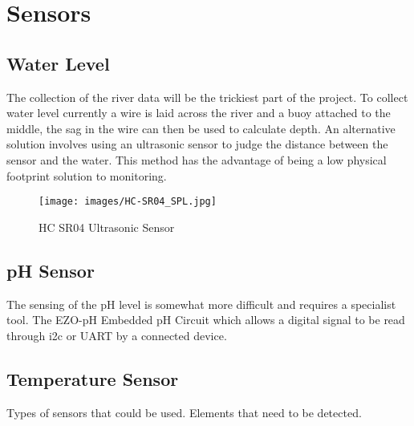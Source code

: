 \section{Sensors}
\subsection{Water Level}
The collection of the river data will be the trickiest part of the project. To collect water level currently a wire is laid across the river and a buoy attached to the middle, the sag in the wire can then be used to calculate depth. \citep{SEPA2016} An alternative solution involves using an ultrasonic sensor to judge the distance between the sensor and the water. \citep{AravindJayan2016} This method has the advantage of being a low physical footprint solution to monitoring. 

\begin{figure}[H]
	\centering
	\texttt{[image: images/HC-SR04\_SPL.jpg]}\\
	\caption{ HC SR04 Ultrasonic Sensor \citep{MouserElectronics}}
	\label{fig:hcsr04}
\end{figure}

\subsection{pH Sensor}
The sensing of the pH level is somewhat more difficult and requires a specialist tool. The EZO-pH Embedded pH Circuit \citep{AtlasScientific2018a} which allows a digital signal to be read through i2c or UART by a connected device. \cite{Dey2018}

\subsection{Temperature Sensor}

Types of sensors that could be used. Elements that need to be detected. 